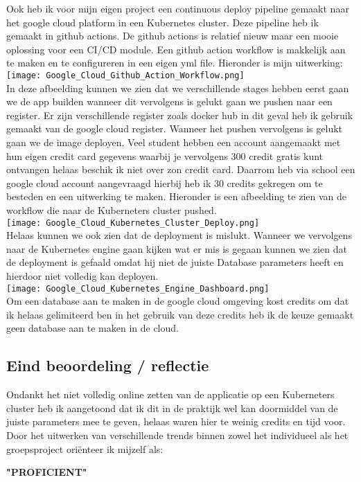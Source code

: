 Ook heb ik voor mijn eigen project een continuous deploy pipeline gemaakt naar het google cloud platform in een Kubernetes cluster.
Deze pipeline heb ik gemaakt in github actions.
De github actions is relatief nieuw maar een mooie oplossing voor een CI/CD module.
Een github action workflow is makkelijk aan te maken en te configureren in een eigen yml file.
Hieronder is mijn uitwerking:\\
\texttt{[image: Google\_Cloud\_Github\_Action\_Workflow.png]}\label{fig:serverless_function_cost}\\
In deze afbeelding kunnen we zien dat we verschillende stages hebben eerst gaan we de app builden wanneer dit vervolgens is gelukt gaan we pushen naar een register.
Er zijn verschillende register zoals docker hub in dit geval heb ik gebruik gemaakt van de google cloud register.
Wanneer het pushen vervolgens is gelukt gaan we de image deployen.
Veel student hebben een account aangemaakt met hun eigen credit card gegevens waarbij je vervolgens 300 credit gratis kunt ontvangen helaas beschik ik niet over zon credit card.
Daarrom heb via school een google cloud account aangevraagd hierbij heb ik 30 credits gekregen om te besteden en een uitwerking te maken.
Hieronder is een afbeelding te zien van de workflow die naar de Kuberneters cluster pushed.\\
\texttt{[image: Google\_Cloud\_Kubernetes\_Cluster\_Deploy.png]}\label{fig:serverless_function_cost}\\
Helaas kunnen we ook zien dat de deployment is mislukt.
Wanneer we vervolgens naar de Kubernetes engine gaan kijken wat er mis is gegaan kunnen we zien dat de deployment is gefaald omdat hij niet de juiste Database parameters heeft en hierdoor niet volledig kan deployen.\\
\texttt{[image: Google\_Cloud\_Kubernetes\_Engine\_Dashboard.png]}\label{fig:serverless_function_cost}\\
Om een database aan te maken in de google cloud omgeving kost credits om dat ik helaas gelimiteerd ben in het gebruik van deze credits heb ik de keuze gemaakt geen database aan te maken in de cloud.

\subsection{Eind beoordeling / reflectie}
Ondankt het niet volledig online zetten van de applicatie op een Kuberneters cluster heb ik aangetoond dat ik dit in de praktijk wel kan doormiddel van de juiste parameters mee te geven, helaas waren hier te weinig credits en tijd voor.
Door het uitwerken van verschillende trends binnen zowel het individueel als het groepsproject oriënteer ik mijzelf
als:\
\par\vspace{10pt}\textbf{\uppercase{"Proficient"}}\\




